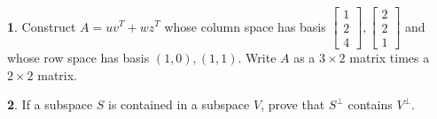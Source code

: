 \documentclass{article}
\theoremstyle{definition}
\newtheorem{prob}{}
\begin{document}
\begin{prob}Construct $A = uv^T + wz^T$ whose column space has basis $\begin{bmatrix} 1 \\ 2 \\ 4 \end{bmatrix}, \begin{bmatrix} 2 \\ 2 \\ 1 \end{bmatrix}$ and whose row space has basis $(1,0), (1,1)$.  Write $A$ as a $3 \times 2$ matrix times a $2 \times 2$ matrix.
\end{prob}

\begin{prob} If a subspace $S$ is contained in a subspace $V$, prove that $S^\perp$ contains $V^\perp$.
\end{prob}
\end{document}
